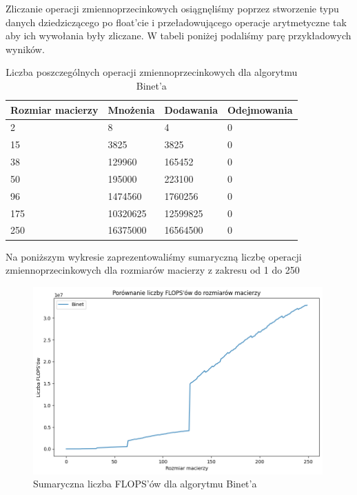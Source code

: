 \documentclass{article}
\begin{document}
Zliczanie operacji zmiennoprzecinkowych osiągnęliśmy poprzez stworzenie typu danych dziedziczącego po float'cie i przeładowującego operacje arytmetyczne tak aby ich wywołania były zliczane. W tabeli poniżej podaliśmy parę przykładowych wyników.

\begin{table}[H]
    \centering
     \begin{tabular}{|l|l|l|l|}
    \hline
        Rozmiar macierzy & Mnożenia & Dodawania & Odejmowania \\ \hline
        2 & 8 & 4 & 0  \\ \hline
        15 & 3825 & 3825 & 0  \\ \hline
        38 & 129960 & 165452 & 0  \\ \hline
        50 & 195000 & 223100 & 0  \\ \hline
        96 & 1474560 & 1760256 & 0  \\ \hline
        175 & 10320625 & 12599825 & 0  \\ \hline
        250 & 16375000 & 16564500 & 0 \\ \hline
    \end{tabular}
    \caption{Liczba poszczególnych operacji zmiennoprzecinkowych dla algorytmu Binet'a}
\end{table}

\noindent
Na poniższym wykresie zaprezentowaliśmy sumaryczną liczbę operacji zmiennoprzecinkowych dla rozmiarów macierzy z zakresu od 1 do 250

\begin{figure}[H]
  \centering
    \includegraphics[width=0.99\textwidth]{binet_flops.png}
  \caption{Sumaryczna liczba FLOPS'ów dla algorytmu Binet'a}
\end{figure}
\end{document}
